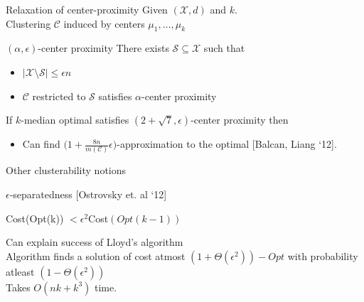 \documentclass{beamer}
\newcommand{\mc}{\mathcal}
\begin{document}
\begin{frame}{Relaxation of center-proximity}
	Given $(\mc X, d)$ and $k$.\\
	\vspace{0.4cm}Clustering $\mc C$ induced by centers $\mu_1, \ldots, \mu_k$
	\vspace{0.5cm}\begin{block}{$(\alpha, \epsilon)$-center proximity}
		There exists $\mc S \subseteq \mc X$ such that 
		\begin{itemize}
			\vspace{0.3cm}\item $|\mc X \setminus \mc S| \le \epsilon n$
			\vspace{0.3cm}\item $\mc C$ restricted to $\mc S$ satisfies $\alpha$-center proximity
		\end{itemize}
	\end{block}
	
	\vspace{0.5cm}If $k$-median optimal satisfies $(2+\sqrt{7}, \epsilon)$-center proximity then 
	\begin{itemize}
		\item Can find $\Big(1 + \frac{8n}{m(\mc C)}\epsilon\Big)$-approximation to the optimal \alert{[Balcan, Liang `12]}.
	\end{itemize}
\end{frame}

\begin{frame}{Other clusterability notions}
	
	{\color{blue}$\epsilon$-separatedness} \alert{[Ostrovsky et. al `12]}\\
	\begin{center}Cost(Opt(k)) $< \epsilon^2$Cost$(Opt(k-1))$\end{center}

	\vspace{0.5cm}Can {\color{blue} explain success} of Lloyd's algorithm \\
	
	
	\vspace{1cm}Algorithm finds a solution of cost atmost $(1+\Theta(\epsilon^2))-Opt$ with probability atleast $(1-\Theta(\epsilon^2))$\\
	
	\vspace{0.5cm} Takes $O(nk + k^3)$ time.
	
\end{frame}
\end{document}
